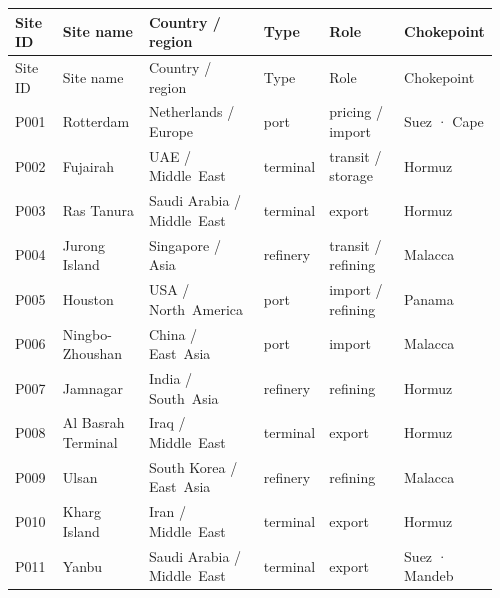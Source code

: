 \documentclass[
  british,
  12pt,
  oneside]{book}
\begin{document}
{\begingroup
\small
\begin{longtable}{@{}
  Y{0.10\linewidth}
  Y{0.18\linewidth}
  Y{0.24\linewidth}
  Y{0.10\linewidth}
  Y{0.16\linewidth}
  Y{0.18\linewidth}@{}}
\toprule
Site ID & Site name & Country / region & Type & Role & Chokepoint \\
\midrule
\endfirsthead
\toprule
Site ID & Site name & Country / region & Type & Role & Chokepoint \\
\midrule
\endhead
\bottomrule
\endlastfoot
P001 & Rotterdam & Netherlands / Europe & port & pricing / import & Suez · Cape \\
P002 & Fujairah & UAE / Middle~East & terminal & transit / storage & Hormuz \\
P003 & Ras Tanura & Saudi Arabia / Middle~East & terminal & export & Hormuz \\
P004 & Jurong Island & Singapore / Asia & refinery & transit / refining & Malacca \\
P005 & Houston & USA / North~America & port & import / refining & Panama \\
P006 & Ningbo-Zhoushan & China / East~Asia & port & import & Malacca \\
P007 & Jamnagar & India / South~Asia & refinery & refining & Hormuz \\
P008 & Al Basrah Terminal & Iraq / Middle~East & terminal & export & Hormuz \\
P009 & Ulsan & South Korea / East~Asia & refinery & refining & Malacca \\
P010 & Kharg Island & Iran / Middle~East & terminal & export & Hormuz \\
P011 & Yanbu & Saudi Arabia / Middle~East & terminal & export & Suez · Mandeb \\
\end{longtable}

}
\end{document}

